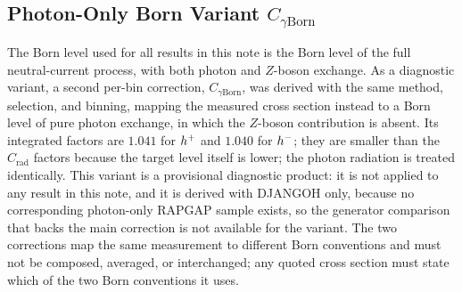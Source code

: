 \subsection{Photon-Only Born Variant $C_{\gamma\mathrm{Born}}$}
\label{sec:radiative_corrections:photon-born-variant}

The Born level used for all results in this note is the Born level of the
full neutral-current process, with both photon and $Z$-boson exchange.
As a diagnostic variant, a second per-bin correction,
$C_{\gamma\mathrm{Born}}$, was derived with the same method, selection,
and binning, mapping the measured cross section instead to a Born level
of pure photon exchange, in which the $Z$-boson contribution is absent.
Its integrated factors are $1.041$ for $h^{+}$ and
$1.040$ for $h^{-}$; they are smaller than the
$C_{\mathrm{rad}}$ factors because the target level itself is lower; the
photon radiation is treated identically.  This variant
is a provisional diagnostic product: it is not applied to any result in
this note, and it is derived with DJANGOH only, because no corresponding
photon-only RAPGAP sample exists, so the generator comparison that backs
the main correction is not available for the variant.  The two
corrections map the same measurement to different Born conventions and
must not be composed, averaged, or interchanged; any quoted cross section
must state which of the two Born conventions it uses.
